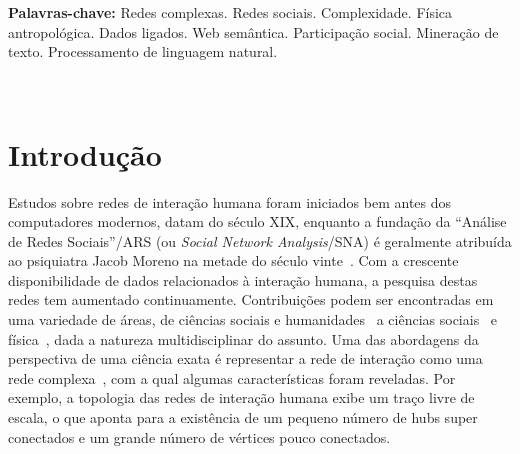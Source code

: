 \documentclass[a4paper,openright,12pt]{report} %
\begin{document}
\begin{singlespace}
\vspace*{1.5cm}
\hspace*{-0.9cm} {\bf Palavras-chave:} Redes complexas. Redes sociais. Complexidade. Física antropológica.
Dados ligados. Web semântica. Participação social. Mineração de texto. Processamento de linguagem natural.

\end{singlespace}

  

%
%


\newpage\ \thispagestyle{empty}  \newpage\thispagestyle{empty}

\tableofcontents\thispagestyle{empty}\thispagestyle{empty}%

\clearpage \thispagestyle{empty}

\pagestyle{fancy}

\chapter{Introdução}
Estudos sobre redes de interação humana foram iniciados bem antes dos computadores modernos,
datam do século XIX, enquanto a fundação da ``Análise de Redes Sociais''/ARS (ou \emph{Social Network Analysis}/SNA)
é geralmente atribuída ao psiquiatra Jacob Moreno na metade do século vinte~\cite{newmanBook}.
Com a crescente disponibilidade de dados relacionados à interação humana, a pesquisa destas redes tem aumentado continuamente.
Contribuições podem ser encontradas em uma variedade de áreas, de ciências sociais e humanidades~\cite{latour2013}
a ciências sociais~\cite{bird} e física~\cite{barabasiHumanDyn,newmanFriendship},
dada a natureza multidisciplinar do assunto.
Uma das abordagens da perspectiva de uma ciência exata é representar a rede de interação como uma rede
complexa~\cite{barabasiHumanDyn,newmanFriendship},
com a qual algumas características foram reveladas.
Por exemplo, a topologia das redes de interação humana exibe um traço livre de escala,
o que aponta para a existência de um pequeno número de hubs super conectados
e um grande número de vértices pouco conectados.
\end{document}
